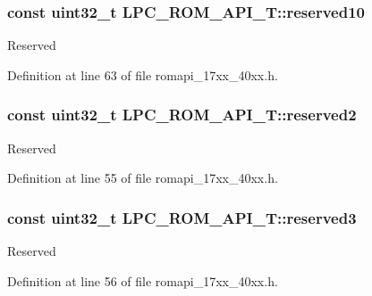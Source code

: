 \subsubsection[{\texorpdfstring{reserved10}{reserved10}}]{\setlength{\rightskip}{0pt plus 5cm}const uint32\+\_\+t L\+P\+C\+\_\+\+R\+O\+M\+\_\+\+A\+P\+I\+\_\+\+T\+::reserved10}\hypertarget{structLPC__ROM__API__T_afb1226faead704ffe1e0c7c5efcb86f2}{}\label{structLPC__ROM__API__T_afb1226faead704ffe1e0c7c5efcb86f2}
Reserved 

Definition at line 63 of file romapi\+\_\+17xx\+\_\+40xx.\+h.

\subsubsection[{\texorpdfstring{reserved2}{reserved2}}]{\setlength{\rightskip}{0pt plus 5cm}const uint32\+\_\+t L\+P\+C\+\_\+\+R\+O\+M\+\_\+\+A\+P\+I\+\_\+\+T\+::reserved2}\hypertarget{structLPC__ROM__API__T_a0ab9f56adf03f0f69b04baa60bcc271a}{}\label{structLPC__ROM__API__T_a0ab9f56adf03f0f69b04baa60bcc271a}
Reserved 

Definition at line 55 of file romapi\+\_\+17xx\+\_\+40xx.\+h.

\subsubsection[{\texorpdfstring{reserved3}{reserved3}}]{\setlength{\rightskip}{0pt plus 5cm}const uint32\+\_\+t L\+P\+C\+\_\+\+R\+O\+M\+\_\+\+A\+P\+I\+\_\+\+T\+::reserved3}\hypertarget{structLPC__ROM__API__T_a70c7b14958f6d5af166224d04148e945}{}\label{structLPC__ROM__API__T_a70c7b14958f6d5af166224d04148e945}
Reserved 

Definition at line 56 of file romapi\+\_\+17xx\+\_\+40xx.\+h.

